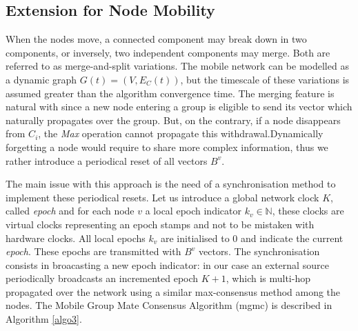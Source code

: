 \documentclass{sig-alternate}
\begin{document}
\addtocounter{equation}{-1}





\newcommand{\mgmc}{\sc mgmc}
\subsection{Extension for Node Mobility }
\label{sec:period}
When the nodes move, a connected component may break down in two components, or inversely, two independent components may merge. Both are referred to as merge-and-split variations. The mobile network can be modelled as a dynamic graph $G(t)=(V,E_C(t))$, but the timescale of these variations is assumed greater than the algorithm convergence time.
The merging feature is natural with {\sgc} since a new node entering a group is eligible to send its vector which naturally propagates over the group.
But, on the contrary, if a node disappears from $C_i$, the \emph{Max} operation cannot propagate this withdrawal.Dynamically forgetting a node would require to share more complex information, thus we rather introduce a periodical reset of all vectors $B^v$.


The main issue with this approach is the need of a synchronisation method to implement these periodical resets. Let us introduce a global network clock $K$, called {\em epoch} and for each node $v$ a local epoch indicator $k_v \in \mathbb{N}$, these clocks are virtual clocks representing an epoch stamps and not to be mistaken with hardware clocks. All local epochs $k_v$ are initialised to 0 and indicate the current {\em epoch}. These epochs are transmitted with $B^v$ vectors. The synchronisation consists in broacasting a new epoch indicator: in our case an external source periodically broadcasts an incremented epoch $K+1$, which is multi-hop propagated over the network using a similar max-consensus method among the nodes.
The Mobile Group Mate Consensus Algorithm ({\mgmc}) is described in Algorithm \ref{algo3}.
\end{document}
